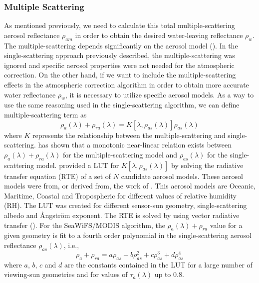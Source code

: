 \subsubsection{Multiple Scattering}
As mentioned  previously, we need to calculate this total multiple-scattering aerosol reflectance $\rho_{am}$ in order to obtain the desired water-leaving reflectance $\rho_w$. The multiple-scattering depends significantly on the aerosol model (\cite{Gordon:1997}). In the single-scattering approach previously described, the multiple-scattering was ignored and specific aerosol properties were not needed for the atmospheric correction. On the other hand, if we want to include the multiple-scattering effects in the atmospheric correction algorithm in order to obtain more accurate water reflectance $\rho_w$, it is necessary to utilize specific aerosol models. As a way to use the same reasoning used in the single-scattering algorithm, we can define multiple-scattering term as
\begin{equation}\label{eq:multscat}
  \rho_a(\lambda) + \rho_{ra}(\lambda) = K[\lambda,\rho_{as}(\lambda)]\rho_{as}(\lambda)
\end{equation}
where $K$ represents the relationship between the multiple-scattering and single-scattering. \cite{Wang:1991} has shown that a monotonic near-linear relation exists between $\rho_a(\lambda)+\rho_{ra}(\lambda)$ for the multiple-scattering model and $\rho_{as}(\lambda)$ for the single-scattering model. \cite{Gordon:1994} provided a LUT for $K[\lambda,\rho_{as}(\lambda)]$ by solving the radiative transfer equation (RTE) of a set of $N$ candidate aerosol models. These aerosol models were from, or derived from, the work of \cite{Shettle:1979}. This aerosol models are Oceanic, Maritime, Coastal and Tropospheric for different values of relative humidity (RH). The LUT was created for different sensor-sun geometry, single-scattering albedo and \AA ngstr\"{o}m exponent. The RTE is solved by using vector radiative transfer (\cite{IOCCG:2010}). For the SeaWiFS/MODIS algorithm, the $\rho_a(\lambda)+\rho_{ra}$ value for a given geometry is fit to a fourth order polynomial in the single-scattering aerosol reflectance $\rho_{as}(\lambda)$, i.e.,
\begin{equation}\label{eq:polynomial}
  \rho_a+\rho_{ra} = a\rho_{as}+b\rho_{as}^2+c\rho_{as}^3+d\rho_{as}^4
\end{equation}
where $a$, $b$, $c$ and $d$ are the constants contained in the LUT for a large number of viewing-sun geometries and for values of $\tau_a(\lambda)$ up to $0.8$.

